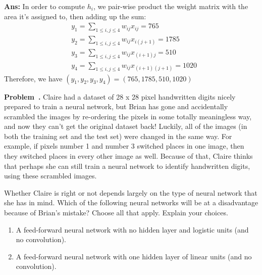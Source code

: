 \documentclass{article}
\newcounter{problem}[section]
\newenvironment{problem}[1][]{\refstepcounter{problem}\par\medskip
   \noindent \textbf{Problem~\theproblem. #1} \rmfamily}{\medskip}
\newenvironment{proof}{\begin{mdframed}\textbf{Ans:}}{ \end{mdframed}}
\begin{document}
\begin{proof}
    In order to compute  $h_i$, we pair-wise product the weight matrix with the area it's assigned to, then adding up the sum:
    \begin{equation}
    \begin{split}
    &y_1 = \sum_{1\leq i,j \leq 4} w_{ij}x_{ij} = 765\\
    &y_2 = \sum_{1\leq i,j \leq 4} w_{ij}x_{i(j+1)}  = 1785\\
    &y_3 = \sum_{1\leq i,j \leq 4} w_{ij}x_{(i+1)j}  = 510\\
    &y_4 = \sum_{1\leq i,j \leq 4} w_{ij}x_{(i+1)(j+1)}  = 1020
    \end{split}
    \end{equation}
    Therefore, we have $(y_1,y_2,y_3,y_4) = (765,1785,510,1020)$
\end{proof}
\begin{problem}
    Claire had a dataset of 28 x 28 pixel handwritten digits nicely prepared to train a neural network, but Brian has gone and accidentally scrambled the images by re-ordering the pixels in some totally meaningless way, and now they can’t get the original dataset back!
    Luckily, all of the images (in both the training set and the test set) were changed in the same way. For example, if pixels number 1 and number 3 switched places in one image, then they switched places in every other image as well. Because of that, Claire thinks that perhaps she can still train a neural network to identify handwritten digits, using these scrambled images.

    Whether Claire is right or not depends largely on the type of neural network that she has in mind. Which of the following neural networks will be at a disadvantage because of Brian’s mistake? Choose all that apply.
    Explain your choices.
\begin{enumerate}
    \item A feed-forward neural network with no hidden layer and logistic units (and no convolution).

    \item A feed-forward neural network with one hidden layer of linear units (and no convolution).
    {\color{ForestGreen}{
    \item A convolutional neural network where the size of each weight filter is 8 x 8.
    }}
    {\color{ForestGreen}{
    \item A convolutional neural network where the size of each weight filter is 10 x 10.
    }}
\end{enumerate}
\end{problem}
\end{document}
